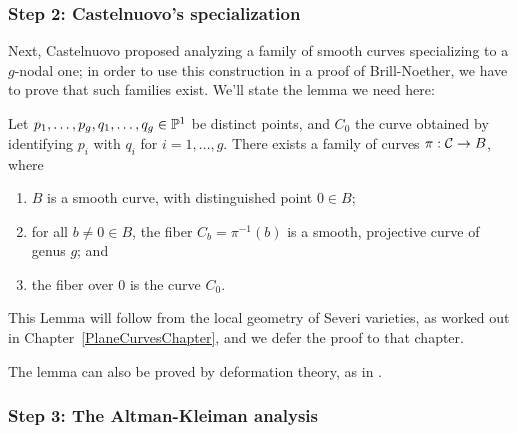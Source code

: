 \subsubsection{Step 2: Castelnuovo's specialization}

Next, Castelnuovo proposed analyzing a family of smooth curves specializing to a $g$-nodal one; in order to use this construction in a proof of Brill-Noether, we have to prove that such families exist. We'll state the lemma we need here:

\begin{lemma}\label{specialization to nodal curve}
Let $p_1,\dots,p_g, q_1,\dots, q_g \in \PP^1$ be distinct points, and $C_0$ the curve obtained by identifying $p_i$ with $q_i$ for $i = 1,\dots,g$. There exists a family of curves $\pi : \cC \to B$, where
\begin{enumerate}
\item $B$ is a smooth curve, with distinguished point $0 \in B$;
\item for all $b \neq 0 \in B$, the fiber $C_b = \pi^{-1}(b)$ is a smooth, projective curve of genus $g$;  and
\item the fiber over $0$ is the curve $C_0$.
\end{enumerate}
\end{lemma}

This Lemma will follow from the local geometry of Severi varieties, as worked out in Chapter~\ref{PlaneCurvesChapter}, and we defer the proof to that chapter.

The lemma can also be proved by deformation theory, as in . 
%
%
%

\subsubsection{Step 3: The Altman-Kleiman analysis}

